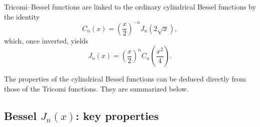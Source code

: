 Tricomi--Bessel functions are linked to the ordinary cylindrical Bessel
functions by the identity
\begin{equation}
C_n(x) = \left(\frac{x}{2}\right)^{-n} J_n\!\left(2\sqrt{x}\right),
\label{eq:4.4.13}
\end{equation}
which, once inverted, yields
\begin{equation}
J_n(x) = \left(\frac{x}{2}\right)^{\!n}
C_n\!\left(\frac{x^2}{4}\right).
\label{eq:4.4.14}
\end{equation}

The properties of the cylindrical Bessel functions can be deduced directly
from those of the Tricomi functions. They are summarized below.

\subsection*{Bessel $J_n(x)$: key properties}

